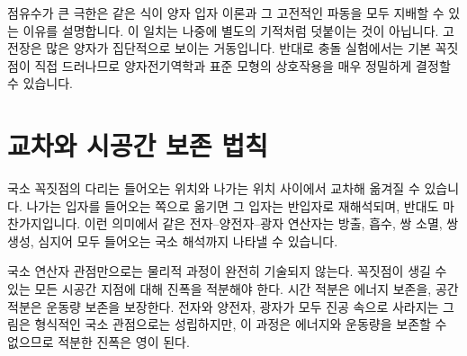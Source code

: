 점유수가 큰 극한은 같은 식이 양자 입자 이론과 그 고전적인 파동을 모두 지배할 수 있는 이유를 설명합니다. 이 일치는 나중에 별도의 기적처럼 덧붙이는 것이 아닙니다. 고전장은 많은 양자가 집단적으로 보이는 거동입니다. 반대로 충돌 실험에서는 기본 꼭짓점이 직접 드러나므로 양자전기역학과 표준 모형의 상호작용을 매우 정밀하게 결정할 수 있습니다.

\section{교차와 시공간 보존 법칙}

국소 꼭짓점의 다리는 들어오는 위치와 나가는 위치 사이에서 교차해 옮겨질 수 있습니다. 나가는 입자를 들어오는 쪽으로 옮기면 그 입자는 반입자로 재해석되며, 반대도 마찬가지입니다. 이런 의미에서 같은 전자--양전자--광자 연산자는 방출, 흡수, 쌍 소멸, 쌍 생성, 심지어 모두 들어오는 국소 해석까지 나타낼 수 있습니다.

\begin{classroomqa}
\end{classroomqa}

국소 연산자 관점만으로는 물리적 과정이 완전히 기술되지 않는다. 꼭짓점이 생길 수 있는 모든 시공간 지점에 대해 진폭을 적분해야 한다. 시간 적분은 에너지 보존을, 공간 적분은 운동량 보존을 보장한다. 전자와 양전자, 광자가 모두 진공 속으로 사라지는 그림은 형식적인 국소 관점으로는 성립하지만, 이 과정은 에너지와 운동량을 보존할 수 없으므로 적분한 진폭은 영이 된다.

\begin{classroomqa}
\end{classroomqa}

\begin{classroomqa}
\end{classroomqa}

